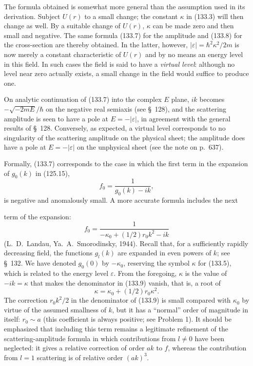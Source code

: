 The formula obtained is somewhat more general than the assumption used in its
derivation. Subject $U(r)$ to a small change; the constant $\kappa$ in (133.3)
will then change as well. By a suitable change of $U(r)$, $\kappa$ can be made
zero and then small and negative. The same formula (133.7) for the amplitude
and (133.8) for the cross-section are thereby obtained. In the latter,
however, $|\varepsilon|=\hbar^2\kappa^2/2m$ is now merely a constant
characteristic of $U(r)$ and by no means an energy level in this field. In
such cases the field is said to have a \emph{virtual level}: although no level
near zero actually exists, a small change in the field would suffice to
produce one.

On analytic continuation of (133.7) into the complex $E$ plane, $ik$ becomes
$-\sqrt{-2mE}/\hbar$ on the negative real semiaxis (see \S~128), and the
scattering amplitude is seen to have a pole at $E=-|\varepsilon|$, in
agreement with the general results of \S~128. Conversely, as expected, a
virtual level corresponds to no singularity of the scattering amplitude on
the physical sheet; the amplitude does have a pole at $E=-|\varepsilon|$ on
the unphysical sheet (see the note on p.~637).

Formally, (133.7) corresponds to the case in which the first term in the
expansion of $g_0(k)$ in (125.15),
\[
 f_0=\frac1{g_0(k)-ik},
\]
is negative and anomalously small. A more accurate formula includes the next

term of the expansion:
\begin{equation}
 f_0=\frac1{-\kappa_0+(1/2)r_0k^2-ik}
 \tag{133.9}
\end{equation}
(L.~D.~Landau, Ya.~A.~Smorodinsky, 1944). Recall that, for a sufficiently
rapidly decreasing field, the functions $g_l(k)$ are expanded in even powers
of $k$; see \S~132. We have denoted $g_0(0)$ by $-\kappa_0$, reserving the
symbol $\kappa$ for (133.5), which is related to the energy level
$\varepsilon$. From the foregoing, $\kappa$ is the value of $-ik=\kappa$
that makes the denominator in (133.9) vanish, that is, a root of
\begin{equation}
 \kappa=\kappa_0+(1/2)r_0\kappa^2.
 \tag{133.10}
\end{equation}
The correction $r_0k^2/2$ in the denominator of (133.9) is small compared
with $\kappa_0$ by virtue of the assumed smallness of $k$, but it has a
``normal'' order of magnitude in itself: $r_0\sim a$ (this coefficient is
always positive; see Problem 1). It should be emphasized that including this
term remains a legitimate refinement of the scattering-amplitude formula in
which contributions from $l\ne0$ have been neglected: it gives a relative
correction of order $ak$ to $f$, whereas the contribution from $l=1$
scattering is of relative order $(ak)^3$.

